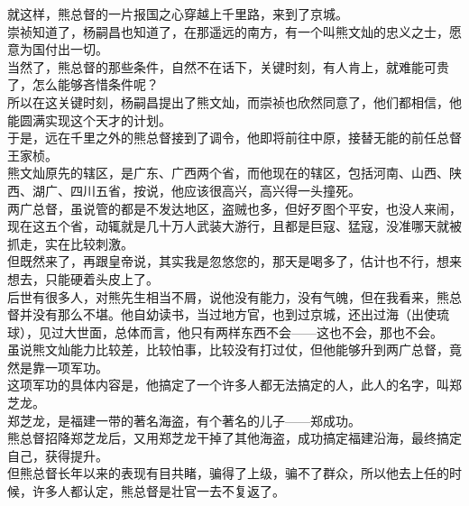 \begin{multicols}{\theparacolNo}
就这样，熊总督的一片报国之心穿越上千里路，来到了京城。\\

崇祯知道了，杨嗣昌也知道了，在那遥远的南方，有一个叫熊文灿的忠义之士，愿意为国付出一切。\\

当然了，熊总督的那些条件，自然不在话下，关键时刻，有人肯上，就难能可贵了，怎么能够吝惜条件呢？\\

所以在这关键时刻，杨嗣昌提出了熊文灿，而崇祯也欣然同意了，他们都相信，他能圆满实现这个天才的计划。\\

于是，远在千里之外的熊总督接到了调令，他即将前往中原，接替无能的前任总督王家桢。\\

熊文灿原先的辖区，是广东、广西两个省，而他现在的辖区，包括河南、山西、陕西、湖广、四川五省，按说，他应该很高兴，高兴得一头撞死。\\

两广总督，虽说管的都是不发达地区，盗贼也多，但好歹图个平安，也没人来闹，现在这五个省，动辄就是几十万人武装大游行，且都是巨寇、猛寇，没准哪天就被抓走，实在比较刺激。\\

但既然来了，再跟皇帝说，其实我是忽悠您的，那天是喝多了，估计也不行，想来想去，只能硬着头皮上了。\\

后世有很多人，对熊先生相当不屑，说他没有能力，没有气魄，但在我看来，熊总督并没有那么不堪。他自幼读书，当过地方官，也到过京城，还出过海（出使琉球），见过大世面，总体而言，他只有两样东西不会——这也不会，那也不会。\\

虽说熊文灿能力比较差，比较怕事，比较没有打过仗，但他能够升到两广总督，竟然是靠一项军功。\\

这项军功的具体内容是，他搞定了一个许多人都无法搞定的人，此人的名字，叫郑芝龙。\\

郑芝龙，是福建一带的著名海盗，有个著名的儿子——郑成功。\\

熊总督招降郑芝龙后，又用郑芝龙干掉了其他海盗，成功搞定福建沿海，最终搞定自己，获得提升。\\

但熊总督长年以来的表现有目共睹，骗得了上级，骗不了群众，所以他去上任的时候，许多人都认定，熊总督是壮官一去不复返了。\\


\end{multicols}
